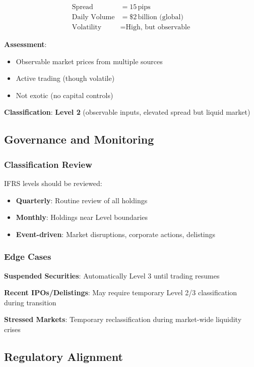 \documentclass[11pt,a4paper]{article}
\begin{document}
\begin{align*}
\text{Spread} &= 15\,\text{pips} \\
\text{Daily Volume} &= \$2\,\text{billion (global)} \\
\text{Volatility} &= \text{High, but observable}
\end{align*}

\textbf{Assessment}:
\begin{itemize}
    \item Observable market prices from multiple sources
    \item Active trading (though volatile)
    \item Not exotic (no capital controls)
\end{itemize}

\textbf{Classification}: \textbf{Level 2} (observable inputs, elevated spread but liquid market)

\subsection{Governance and Monitoring}

\subsubsection{Classification Review}

IFRS levels should be reviewed:
\begin{itemize}
    \item \textbf{Quarterly}: Routine review of all holdings
    \item \textbf{Monthly}: Holdings near Level boundaries
    \item \textbf{Event-driven}: Market disruptions, corporate actions, delistings
\end{itemize}

\subsubsection{Edge Cases}

\textbf{Suspended Securities}: Automatically Level 3 until trading resumes

\textbf{Recent IPOs/Delistings}: May require temporary Level 2/3 classification during transition

\textbf{Stressed Markets}: Temporary reclassification during market-wide liquidity crises

\subsection{Regulatory Alignment}
\end{document}
